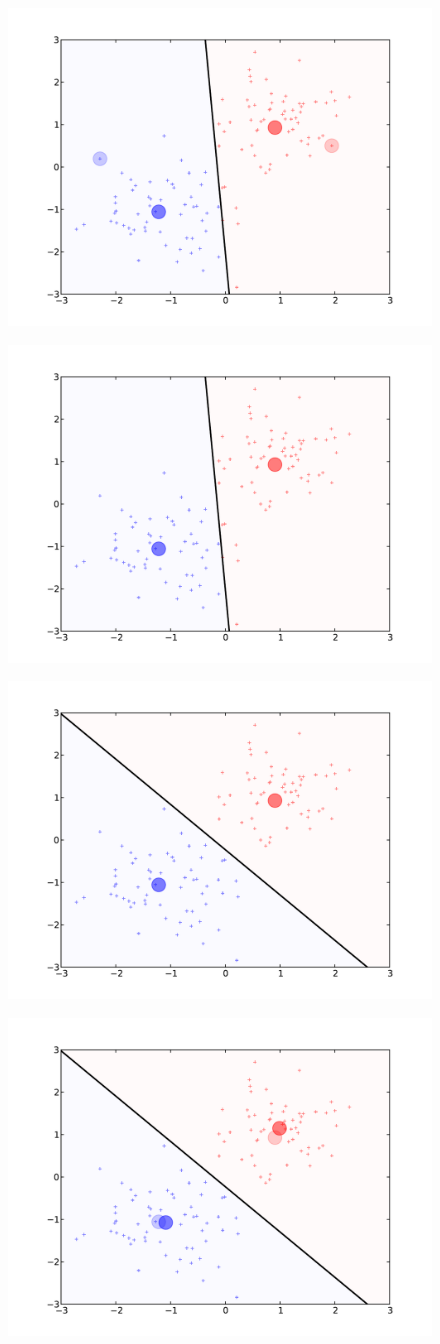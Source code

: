 \documentclass[a4paper]{article}
\begin{document}
\begin{figure}
    \centering
    \includegraphics[width=.7\textwidth]{./kmeans_regular_3.pdf}
\end{figure}
\begin{figure}
    \centering
    \includegraphics[width=.7\textwidth]{./kmeans_regular_4.pdf}
\end{figure}
\begin{figure}
    \centering
    \includegraphics[width=.7\textwidth]{./kmeans_regular_5.pdf}
\end{figure}
\begin{figure}
    \centering
    \includegraphics[width=.7\textwidth]{./kmeans_regular_6.pdf}
\end{figure}
\end{document}
